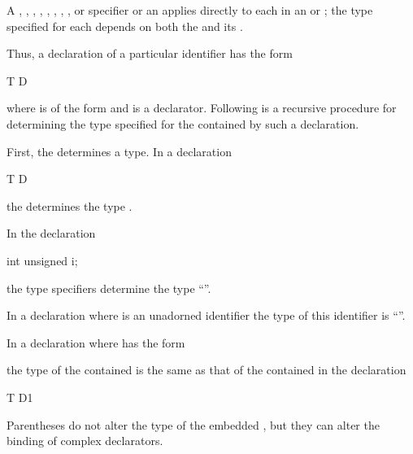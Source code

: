 \pnum
A
,
,
,
,
,
,
,
,
or
specifier
or an 
applies directly to each 
in an  or ;
the type specified for each  depends on
both the  and its .

\pnum
Thus, a declaration of a particular identifier has the form

\begin{codeblock}
T D
\end{codeblock}

where
is of the form 
and
is a declarator.
Following is a recursive procedure for determining
the type specified for the contained
by such a declaration.

\pnum
First, the
determines a type.
In a declaration

\begin{codeblock}
T D
\end{codeblock}

the
determines the type
.
\begin{example}
In the declaration

\begin{codeblock}
int unsigned i;
\end{codeblock}

the type specifiers
determine the type
``''.
\end{example}

\pnum
In a declaration
where
is an unadorned identifier the type of this identifier is
``''.

\pnum
In a declaration
where
has the form

\begin{ncsimplebnf}
\terminal{(}  \terminal{)}
\end{ncsimplebnf}

the type of the contained
is the same as that of the contained
in the declaration
\begin{codeblock}
T D1
\end{codeblock}
%
Parentheses do not alter the type of the embedded
,
but they can alter the binding of complex declarators.

